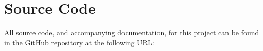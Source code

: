 \chapter{Source Code}
\label{appendix:src}

All source code, and accompanying documentation, for this project can be found in the GitHub repository at the following URL: 



